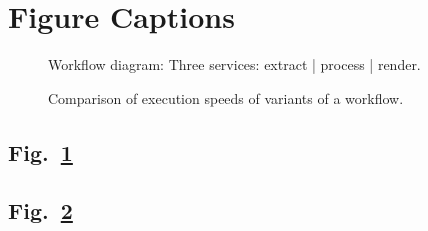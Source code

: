 \documentclass[a4paper]{article}
\begin{document}

\newpage
\singlespace

\section*{Figure Captions}

\begin{figure}[h]
\caption{Workflow diagram: Three services: extract | process | render.}\label{fig:workflow}
\end{figure}

\begin{figure}[h]
\caption{Comparison of execution speeds of variants of a workflow.}\label{fig:workflowspeeds}
\end{figure}

\newpage

\subsection*{Fig.~\ref{fig:workflow}}

\newpage

\subsection*{Fig.~\ref{fig:workflowspeeds}}

\end{document}
